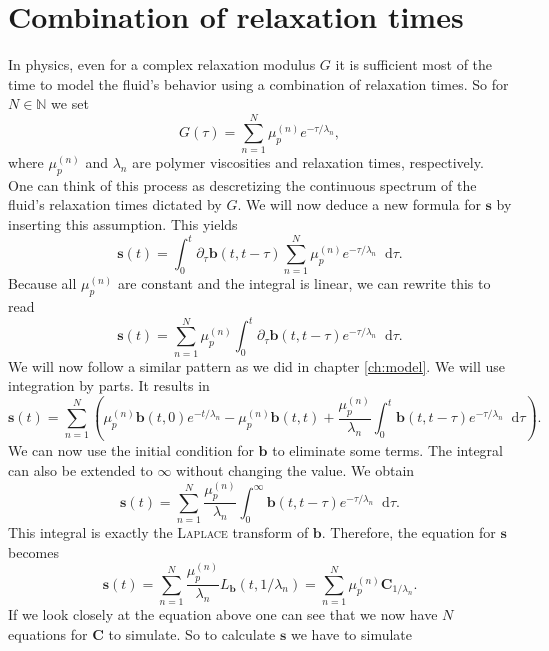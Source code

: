 \documentclass[12pt,a4paper,twoside, open=right]{scrreprt}
\theoremstyle{definition}
\theoremstyle{plain}
\newcommand{\nn}{\mathbb{N}}
\newcommand{\bfb}{\bm{b}}
\newcommand{\bfs}{\bm{s}}
\newcommand{\bfC}{\bm{C}}
\newcommand{\D}{\mathop{}\!\mathrm{d}}
\begin{document}
\section{Combination of relaxation times}
In physics, even for a complex relaxation modulus $G$ it is sufficient most of the time to model the fluid's behavior using a combination of relaxation times. So for $N\in\nn$ we set
\begin{equation}
    G(\tau)=\sum_{n=1}^{N}\mu_p^{(n)}e^{-\tau/\lambda_n},
\end{equation}
where $\mu_p^{(n)}$ and $\lambda_n$ are polymer viscosities and relaxation times, respectively. One can think of this process as descretizing the continuous spectrum of the fluid's relaxation times dictated by $G$. We will now deduce a new formula for $\bfs$ by inserting this assumption. This yields
\begin{equation}
    \bfs(t)=\int_0^t\partial_\tau \bfb(t,t-\tau)\sum_{n=1}^{N}\mu_p^{(n)}e^{-\tau/\lambda_n}\D\tau.
\end{equation}
Because all $\mu_p^{(n)}$ are constant and the integral is linear, we can rewrite this to read
\begin{equation}
    \bfs(t) = \sum_{n=1}^{N}\mu_p^{(n)}\int_0^t\partial_\tau \bfb(t,t-\tau)e^{-\tau/\lambda_n}\D\tau.
\end{equation}
We will now follow a similar pattern as we did in chapter \ref{ch:model}. We will use integration by parts. It results in
\begin{equation}
    \bfs(t)=\sum_{n=1}^{N}\left(\mu_p^{(n)}\bfb(t,0)e^{-t/\lambda_n}-\mu_p^{(n)}\bfb(t,t)+\frac{\mu_p^{(n)}}{\lambda_n}\int_0^t\bfb(t,t-\tau)e^{-\tau/\lambda_n}\D\tau \right).
\end{equation}
We can now use the initial condition for $\bfb$ to eliminate some terms. The integral can also be extended to $\infty$ without changing the value. We obtain
\begin{equation}
    \bfs(t)=\sum_{n=1}^N\frac{\mu_p^{(n)}}{\lambda_n}\int_0^\infty\bfb(t,t-\tau)e^{-\tau/\lambda_n}\D\tau.
\end{equation}
This integral is exactly the \textsc{Laplace} transform of $\bfb$. Therefore, the equation for $\bfs$ becomes
\begin{equation}
    \bfs(t)=\sum_{n=1}^N\frac{\mu_p^{(n)}}{\lambda_n}L_{\bfb}(t,1/\lambda_n)=\sum_{n=1}^N\mu_p^{(n)}\bfC_{1/\lambda_n}.
\end{equation}
If we look closely at the equation above one can see that we now have $N$ equations for $\bfC$ to simulate. So to calculate $\bfs$ we have to simulate 
\end{document}
